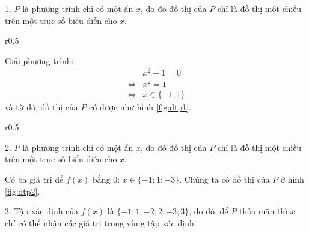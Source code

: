 \documentclass[a4paper, titlepage, openany]{book}
\newcounter{solution}
\begin{document}
\solution[intropt]

1. $P$ là phương trình chỉ có một ẩn $x$, do đó đồ thị của $P$ chỉ là đồ thị một chiều trên một trục số biểu diễn cho $x$.
{
\begin{wrapfigure}{r}{0.5\textwidth}
   \centering
   \caption{Đồ thị phần 1 bài \ref{intropt}}
   \label{fig:dtp1}
\end{wrapfigure}

Giải phương trình:
\begin{align*}
   &x^2 - 1 = 0 \\
   \iff &x^2 = 1 \\
   \iff &x \in \{-1; 1\}
\end{align*}
và từ đó, đồ thị của $P$ có được như hình \ref{fig:dtp1}.
}

\begin{wrapfigure}{r}{0.5\textwidth}
   \centering
   \caption{Đồ thị phần 2 bài \ref{intropt}}
   \label{fig:dtp2}
\end{wrapfigure}
2. $P$ là phương trình chỉ có một ẩn $x$, do đó đồ thị của $P$ chỉ là đồ thị một chiều trên một trục số biểu diễn cho $x$. 

Có ba giá trị để $f(x)$ bằng $0$: $x\in \{-1; 1; -3\}$. Chúng ta có đồ thị của $P$ ở hình \ref{fig:dtp2}.

3. Tập xác định của $f(x)$ là $\{-1; 1; -2; 2; -3; 3\}$, do đó, để $P$ thỏa mãn thì $x$ chí có thể nhận các giá trị trong vùng tập xác định.
\end{document}
